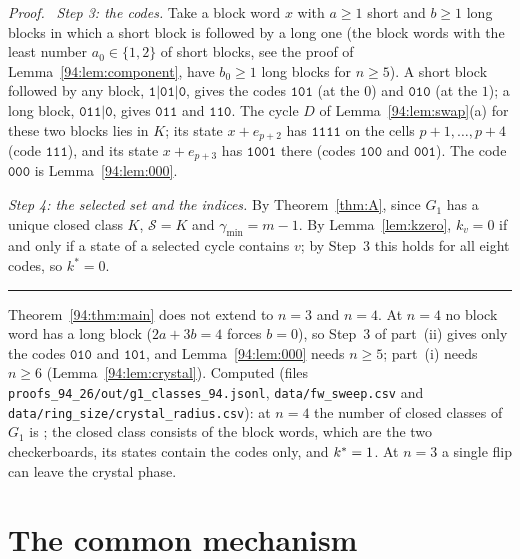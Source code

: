\documentclass[10pt,a4paper]{article}
\newcommand{\qedmark}{\rule{1.1ex}{1.1ex}}
\newenvironment{proof}[1][Proof]{\par\smallskip\noindent\textit{#1.}\ }{\hfill\qedmark\par\smallskip}
\newcommand{\gmin}{\gamma_{\min}}
\newcommand{\Sel}{\mathcal{S}}                %
\newcommand{\Gone}{G_1}                       %
\newcommand{\kst}{k^{*}}
\newcommand{\code}[1]{\mathtt{#1}}            %
\begin{document}
\begin{proof}
\emph{Step 3: the codes.} Take a block word $x$ with $a\ge1$ short and $b\ge1$ long blocks in which a short
block is followed by a long one (the block words with the least number $a_0\in\{1,2\}$ of short blocks, see the proof of
Lemma~\ref{94:lem:component}, have $b_0\ge1$ long blocks for $n\ge5$). A short block followed by any block,
$\code{1}|\code{01}|\code{0}$, gives the codes $\code{101}$ (at the $0$) and $\code{010}$ (at the $1$); a long
block, $\code{011}|\code{0}$, gives $\code{011}$ and $\code{110}$. The cycle $D$ of Lemma~\ref{94:lem:swap}(a)
for these two blocks lies in $K$; its state $x+e_{p+2}$ has $\code{1111}$ on the cells $p+1,\dots,p+4$ (code $\code{111}$), and its
state $x+e_{p+3}$ has $\code{1001}$ there (codes $\code{100}$ and $\code{001}$). The code $\code{000}$ is
Lemma~\ref{94:lem:000}.

\emph{Step 4: the selected set and the indices.} By Theorem~\ref{thm:A}, since $\Gone$ has a unique closed class
$K$, $\Sel=K$ and $\gmin=m-1$. By Lemma~\ref{lem:kzero}, $k_v=0$ if and only if a state of a selected cycle
contains $v$; by Step~3 this holds for all eight codes, so $\kst=0$.
\end{proof}

\begin{remark}\label{94:rem:small}
Theorem~\ref{94:thm:main} does not extend to $n=3$ and $n=4$. At $n=4$ no block word has a long block ($2a+3b=4$
forces $b=0$), so Step~3 of part~(ii) gives only the codes $\code{010}$ and $\code{101}$, and
Lemma~\ref{94:lem:000} needs $n\ge5$; part~(i) needs
$n\ge6$ (Lemma~\ref{94:lem:crystal}). Computed (files \texttt{proofs\_94\_26/out/g1\_classes\_94.jsonl}, \texttt{data/fw\_sweep.csv} and
\texttt{data/ring\_size/crystal\_radius.csv}): at $n=4$ the number of closed classes of $\Gone$ is
\NinetyFourFourClosed; the closed class consists of the \NinetyFourFourClassSize{} block words, which are the two
checkerboards, its states contain the codes \NinetyFourFourCodes{} only, and $\kst=\KstarNinetyFourAtFour$. At $n=3$
a single flip can leave the crystal phase.
\end{remark}

\section{The common mechanism}\label{sec:mechanism}
\end{document}
